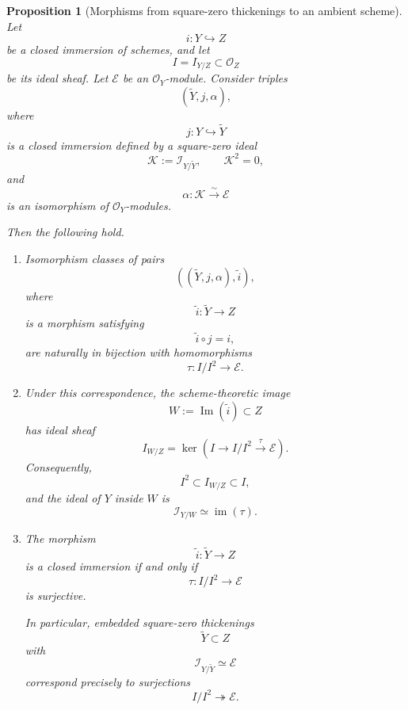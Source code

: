 \documentclass[11pt,twoside]{amsart}
\theoremstyle{plain}
\numberwithin{equation}{section}
\newtheorem{proposition}[theorem]{Proposition}
\theoremstyle{definition}
\begin{document}
\begin{proposition}[Morphisms from square-zero thickenings to an ambient scheme]
\label{prop:square-zero-thickenings-and-morphisms}
Let
\[
    i:Y\hookrightarrow Z
\]
be a closed immersion of schemes, and let
\[
    I=I_{Y/Z}\subset \mathcal O_Z
\]
be its ideal sheaf. Let \(\mathcal E\) be an \(\mathcal O_Y\)-module. Consider triples
\[
    (\widetilde Y,j,\alpha),
\]
where
\[
    j:Y\hookrightarrow \widetilde Y
\]
is a closed immersion defined by a square-zero ideal
\[
    \mathcal K:=\mathcal I_{Y/\widetilde Y},
    \qquad
    \mathcal K^2=0,
\]
and
\[
    \alpha:\mathcal K\xrightarrow{\sim}\mathcal E
\]
is an isomorphism of \(\mathcal O_Y\)-modules.

Then the following hold.

\begin{enumerate}
    \item Isomorphism classes of pairs
    \[
        \left((\widetilde Y,j,\alpha),\widetilde i\right),
    \]
    where
    \[
        \widetilde i:\widetilde Y\to Z
    \]
    is a morphism satisfying
    \[
        \widetilde i\circ j=i,
    \]
    are naturally in bijection with homomorphisms
    \[
        \tau:I/I^2\longrightarrow \mathcal E.
    \]

    \item Under this correspondence, the scheme-theoretic image
    \[
        W:=\operatorname{Im}(\widetilde i)\subset Z
    \]
    has ideal sheaf
    \[
        I_{W/Z}
        =
        \ker\left(
            I
            \longrightarrow
            I/I^2
            \xrightarrow{\tau}
            \mathcal E
        \right).
    \]
    Consequently,
    \[
        I^2\subset I_{W/Z}\subset I,
    \]
    and the ideal of \(Y\) inside \(W\) is
    \[
        \mathcal I_{Y/W}
        \simeq
        \operatorname{im}(\tau).
    \]

    \item The morphism
    \[
        \widetilde i:\widetilde Y\to Z
    \]
    is a closed immersion if and only if
    \[
        \tau:I/I^2\to \mathcal E
    \]
    is surjective.

    In particular, embedded square-zero thickenings
    \[
        \widetilde Y\subset Z
    \]
    with
    \[
        \mathcal I_{Y/\widetilde Y}\simeq\mathcal E
    \]
    correspond precisely to surjections
    \[
        I/I^2\twoheadrightarrow \mathcal E.
    \]
\end{enumerate}
\end{proposition}
\end{document}
